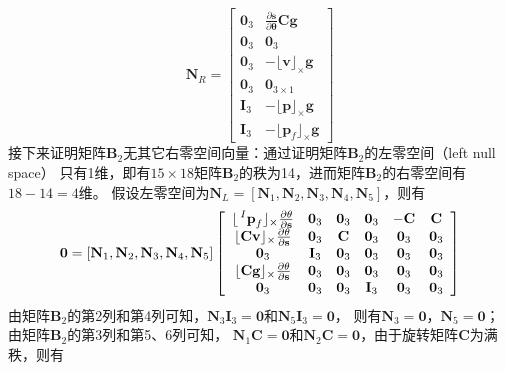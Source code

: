 \documentclass{article}
\begin{document}
\begin{equation}
    \textbf{N}_R=\left[\begin{array}{cc}
        \textbf{0}_3&\frac{\partial\textbf{s}}{\partial\mathbf{\theta}}\textbf{Cg}\\
        \textbf{0}_3&\textbf{0}_3\\
        \textbf{0}_3&-\lfloor\textbf{v}\rfloor_{\times}\textbf{g}\\
        \textbf{0}_3&\textbf{0}_{3\times 1}\\
        \textbf{I}_3&-\lfloor\textbf{p}\rfloor_{\times}\textbf{g}\\
        \textbf{I}_3&-\lfloor\textbf{p}_f\rfloor_{\times}\textbf{g}
    \end{array}\right]
\end{equation}
接下来证明矩阵$\textbf{B}_2$无其它右零空间向量：通过证明矩阵$\textbf{B}_2$的左零空间（left null space）
只有1维，即有$15\times 18$矩阵$\textbf{B}_2$的秩为14，进而矩阵$\textbf{B}_2$的右零空间有$18-14=4$维。
假设左零空间为$\textbf{N}_L=\left[\textbf{N}_1,\textbf{N}_2,\textbf{N}_3,\textbf{N}_4,\textbf{N}_5\right]$，则有
\begin{equation}
    \textbf{0}=\left[\textbf{N}_1,\textbf{N}_2,\textbf{N}_3,\textbf{N}_4,\textbf{N}_5\right]
    \left[\begin{array}{cccccc}
        \lfloor\sideset{^I}{}{\mathop{\textbf{p}_f}}\rfloor_{\times}\frac{\partial\mathbf{\theta}}{\partial\textbf{s}}&\textbf{0}_3&\textbf{0}_3&\textbf{0}_3&-\textbf{C}&\textbf{C}\\
        \lfloor\textbf{Cv}\rfloor_{\times}\frac{\partial\mathbf{\theta}}{\partial\textbf{s}}&\textbf{0}_3&\textbf{C}&\textbf{0}_3&\textbf{0}_3&\textbf{0}_3\\
        \textbf{0}_3&\textbf{I}_3&\textbf{0}_3&\textbf{0}_3&\textbf{0}_3&\textbf{0}_3\\
        \lfloor\textbf{Cg}\rfloor_{\times}\frac{\partial\mathbf{\theta}}{\partial\textbf{s}}&\textbf{0}_3&\textbf{0}_3&\textbf{0}_3&\textbf{0}_3&\textbf{0}_3\\
        \textbf{0}_3&\textbf{0}_3&\textbf{0}_3&\textbf{I}_3&\textbf{0}_3&\textbf{0}_3
    \end{array}\right]
\end{equation}
由矩阵$\textbf{B}_2$的第2列和第4列可知，$\textbf{N}_3\textbf{I}_3=\textbf{0}$和$\textbf{N}_5\textbf{I}_3=\textbf{0}$，
则有$\textbf{N}_3=\textbf{0}$，$\textbf{N}_5=\textbf{0}$；由矩阵$\textbf{B}_2$的第3列和第5、6列可知，
$\textbf{N}_1\textbf{C}=\textbf{0}$和$\textbf{N}_2\textbf{C}=\textbf{0}$，由于旋转矩阵$\textbf{C}$为满秩，则有
\end{document}
